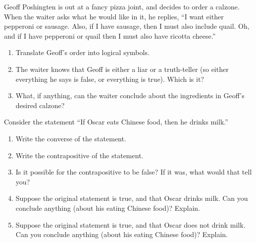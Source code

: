 \documentclass[10pt,]{book}
\theoremstyle{plain}
\theoremstyle{definition}
\theoremstyle{definition}
\theoremstyle{definition}
\theoremstyle{definition}
\numberwithin{equation}{chapter}
\begin{document}
\begin{divisionexercise}{3}\hypertarget{exercise-179}{}
\hypertarget{p-1485}{}%
Geoff Poshingten is out at a fancy pizza joint, and decides to order a calzone. When the waiter asks what he would like in it, he replies, ``I want either pepperoni or sausage. Also, if I have sausage, then I must also include quail. Oh, and if I have pepperoni or quail then I must also have ricotta cheese.''%
\leavevmode%
\begin{enumerate}[label=(\alph*)]
\item\hypertarget{li-349}{}\hypertarget{p-1486}{}%
Translate Geoff's order into logical symbols.%
\item\hypertarget{li-350}{}\hypertarget{p-1487}{}%
The waiter knows that Geoff is either a liar or a truth-teller (so either everything he says is false, or everything is true).  Which is it?%
\item\hypertarget{li-351}{}\hypertarget{p-1488}{}%
What, if anything, can the waiter conclude about the ingredients in Geoff's desired calzone?%
\end{enumerate}
\end{divisionexercise}%
\begin{divisionexercise}{4}\hypertarget{exercise-180}{}
\hypertarget{p-1489}{}%
Consider the statement ``If Oscar eats Chinese food, then he drinks milk.''%
\leavevmode%
\begin{enumerate}[label=(\alph*)]
\item\hypertarget{li-352}{}\hypertarget{p-1490}{}%
Write the converse of the statement.%
\item\hypertarget{li-353}{}\hypertarget{p-1491}{}%
Write the contrapositive of the statement.%
\item\hypertarget{li-354}{}\hypertarget{p-1492}{}%
Is it possible for the contrapositive to be false? If it was, what would that tell you?%
\item\hypertarget{li-355}{}\hypertarget{p-1493}{}%
Suppose the original statement is true, and that Oscar drinks milk. Can you conclude anything (about his eating Chinese food)? Explain.%
\item\hypertarget{li-356}{}\hypertarget{p-1494}{}%
Suppose the original statement is true, and that Oscar does not drink milk. Can you conclude anything (about his eating Chinese food)? Explain.%
\end{enumerate}
\end{divisionexercise}%
\end{document}
